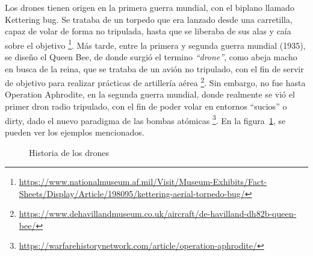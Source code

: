 Los drones tienen origen en la primera guerra mundial, con el biplano llamado Kettering bug. Se trataba de un torpedo que era lanzado desde una carretilla, capaz de volar de forma no tripulada, hasta que se liberaba de sus alas y caía sobre el objetivo \footnote[7]{\url{https://www.nationalmuseum.af.mil/Visit/Museum-Exhibits/Fact-Sheets/Display/Article/198095/kettering-aerial-torpedo-bug/}}. Más tarde, entre la primera y segunda guerra mundial (1935), se diseño el Queen Bee, de donde surgió el termino \emph{``drone''}, como abeja macho en busca de la reina, que se trataba de un avión no tripulado, con el fin de servir de objetivo para realizar prácticas de artillería aérea \footnote[8]{\url{https://www.dehavillandmuseum.co.uk/aircraft/de-havilland-dh82b-queen-bee/}}. Sin embargo, no fue hasta Operation Aphrodite, en la segunda guerra mundial, donde realmente se vió el primer dron radio tripulado, con el fin de poder volar en entornos ``sucios'' o dirty, dado el nuevo paradigma de las bombas atómicas \footnote[9]{\url{https://warfarehistorynetwork.com/article/operation-aphrodite/}}. En la figura~\ref{fig:drone_history}, se pueden ver los ejemplos mencionados.\\

\begin{figure} [tp]
	\centering
	\quad
	\quad
	\caption{Historia de los drones}
	\label{fig:drone_history}
\end{figure}

